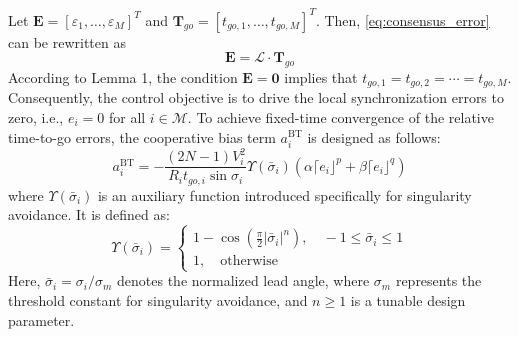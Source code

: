 \documentclass[lettersize,journal]{IEEEtran}
\begin{document}
Let $\mathbf{E}=[\varepsilon_{1},\ldots,\varepsilon_{M}]^{T}$ and $\boldsymbol{T}_{go}=[t_{go,1},\ldots,t_{go,M}]^{T}$. Then, \eqref{eq:consensus_error} can be rewritten as
\begin{equation}
	\mathbf{E}=\mathcal{L}\cdot\boldsymbol{T}_{go}
\end{equation}
According to Lemma 1, the condition $\mathbf{E}=\mathbf{0}$ implies that $t_{go,1}=t_{go,2}=\cdots=t_{go,M}$. Consequently, the control objective is to drive the local synchronization errors to zero, i.e., $e_{i}=0$ for all $i\in\mathcal{M}$. To achieve fixed-time convergence of the relative time-to-go errors, the cooperative bias term $a_{i}^{\mathrm{BT}}$ is designed as follows:
\begin{equation}
	\label{eq:bias_term_design}
	a_i^{{\mathrm{BT}}} = - \frac{(2N-1)V_i^2}{R_i t_{go,i} \sin \sigma_i} \Upsilon(\bar{\sigma}_i) \left( \alpha \lceil e_i \rfloor^p + \beta \lceil e_i \rfloor^q \right)
\end{equation}
where $\Upsilon(\bar{\sigma}_i)$ is an auxiliary function introduced specifically for singularity avoidance. It is defined as:
\begin{equation}
	\label{eq:Upsilon_def}
	\Upsilon (\bar{\sigma}_i ) = \left\{ {\begin{array}{*{20}{l}}
			{1 - \cos \left( {\frac{\pi }{2}|{{\bar \sigma }_i}{|^n}} \right), \quad - 1 \le \bar{\sigma}_i \le 1}\\
			{1,\quad {\mathrm{otherwise}}}
	\end{array}} \right.
\end{equation}
Here, $\bar{\sigma}_i = \sigma_i / \sigma_m$ denotes the normalized lead angle, where $\sigma_m$ represents the threshold constant for singularity avoidance, and $n \ge 1$ is a tunable design parameter.
\end{document}
